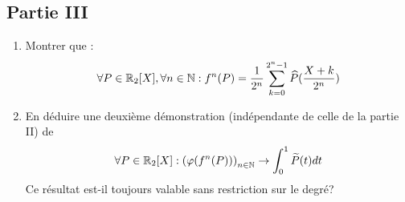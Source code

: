 \subsection*{Partie III}
\begin{enumerate}
 \item Montrer que :
\begin{displaymath}
 \forall P\in \mathbb{R}_2[X], \forall n\in \mathbb{N} :
f^n(P) = \frac{1}{2^n}\sum_{k=0}^{2^n-1}\widehat{P}(\frac{X+k}{2^n})
\end{displaymath}
\item En déduire une deuxième démonstration (indépendante de celle de la partie II) de
\begin{displaymath}
 \forall P\in \mathbb{R}_2[X] :
\left( \varphi(f^n(P))\right)_{n\in \mathbb{N}} \rightarrow  \int_0^1\widetilde{P}(t)dt
\end{displaymath}
Ce résultat est-il toujours valable sans restriction sur le degré?
\end{enumerate}

